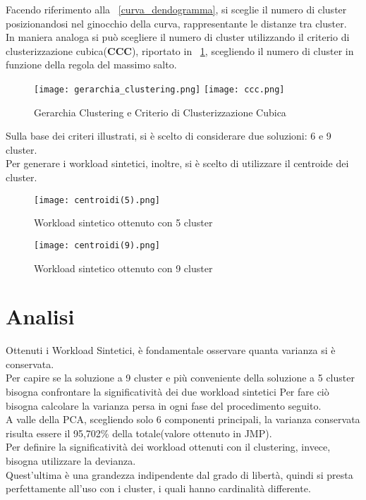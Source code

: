 Facendo riferimento alla \figurename~\ref{curva_dendogramma}, si sceglie il numero
di cluster posizionandosi nel ginocchio della curva, rappresentante le distanze tra cluster.\\
In maniera analoga si può scegliere il numero di cluster utilizzando il criterio
di clusterizzazione cubica(\textbf{CCC}), riportato in \figurename~\ref{ccc},
scegliendo il numero di cluster in funzione della regola del massimo salto.\\

\begin{figure}[htbp]
\centering
\texttt{[image: gerarchia\_clustering.png]}%
\qquad\qquad
\texttt{[image: ccc.png]}
\caption{Gerarchia Clustering e Criterio di Clusterizzazione Cubica}
\label{ccc}
\end{figure}

\clearpage

Sulla base dei criteri illustrati, si è scelto di considerare due soluzioni:
6 e 9 cluster.\\
Per generare i workload sintetici, inoltre, si è scelto di utilizzare il
centroide dei cluster.\\

\begin{figure}[!htbp]
	\texttt{[image: centroidi(5).png]}
  \caption{Workload sintetico ottenuto con 5 cluster}
  \label{}
\end{figure}

\begin{figure}[!htbp]
	\texttt{[image: centroidi(9).png]}
  \caption{Workload sintetico ottenuto con 9 cluster}
  \label{}
\end{figure}

\clearpage
\section{Analisi}
Ottenuti i Workload Sintetici, è fondamentale osservare quanta varianza si è
conservata.\\
Per capire se la soluzione a 9 cluster e più conveniente della soluzione
a 5 cluster bisogna confrontare la significatività dei due workload sintetici
Per fare ciò bisogna calcolare la varianza persa in ogni fase del procedimento seguito.\\
A valle della PCA, scegliendo solo 6 componenti principali, la varianza conservata
 risulta essere il 95,702\% della totale(valore ottenuto in JMP).\\
Per definire la significatività dei workload ottenuti con il clustering, invece, bisogna
utilizzare la devianza.\\
Quest'ultima è una grandezza indipendente dal grado di libertà, quindi si presta
perfettamente all'uso con i cluster, i quali hanno cardinalità differente.\\

